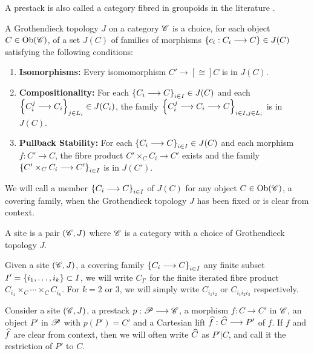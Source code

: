 \documentclass[11pt]{amsart}
\begin{document}
\begin{rmk}
A prestack is also called a category fibred in groupoids in the literature
\cite[\href{https://stacks.math.columbia.edu/tag/003S}{Section 003S}]{stacks-project}.
\end{rmk}

\begin{defn}
A Grothendieck topology $J$ on a category $\mathscr{C}$ is a choice, for each object $C \in \Ob{\sC}$,
of a set $J(C)$ of families of morphisms $\set{c_i : C_i \to C} \in J(C)$ satisfying the following
conditions:
\begin{enumerate}
\item \textbf{Isomorphisms:}
Every isomomorphism $C' \to[\cong] C$ is in $J(C)$.
\item \textbf{Compositionality:}
For each $\set{C_i \to C}_{i \in I} \in J(C)$ and each $\set{C^j_i \to C_i}_{j \in L_i} \in J(C_i)$,
the family $\set{C^j_i \to C_i \to C}_{i \in I, j \in L_i}$ is in $J(C)$.
\item \textbf{Pullback Stability:}
For each $\set{C_i \to C}_{i \in I} \in J(C)$ and each morphism $f : C' \to C$, the fibre product
$C' \times_C C_i \to C'$ exists and the family $\set{C' \times_C C_i \to C'}_{i \in I}$
is in $J(C')$.
\end{enumerate}
We will call a member $\set{C_i \to C}_{i \in I}$ of $J(C)$ for any object
$C \in \Ob{\sC}$, a covering family, when the Grothendieck topology $J$ has been fixed or is clear
from context.
\end{defn}

\begin{defn}[Site]
A site is a pair $(\mathscr{C}, J)$ where $\mathscr{C}$ is a category with a choice of Grothendieck topology $J$.
\end{defn}

\begin{notn}
Given a site $(\mathscr{C}, J)$, a covering family $\set{C_i \to C}_{i \in I}$ any finite subset
$I' = \set{i_1, \dots, i_k} \subset I$, we will write $C_{I'}$ for the finite iterated
fibre product $C_{i_1} \times_C \cdots \times_C C_{i_k}$. For $k = 2$ or $3$, we will simply write
$C_{i_1i_2}$ or $C_{i_1i_2i_3}$ respectively.
\end{notn}

\begin{defn}
Consider a site $(\mathscr{C}, J)$, a prestack $p : \sP \to \sC$, a morphism $f : C \to C'$
in $\mathscr{C}$, an object $P'$ in $\mathscr{P}$ with $p(P') = C'$ and a Cartesian lift $\wh{f} : \wh{C} \to P'$
of $f$. If $f$ and $\widehat{f}$ are clear from context, then we will often write $\widehat{C}$
as $P'|C$, and call it the restriction of $P'$ to $C$.
\end{defn}
\end{document}

